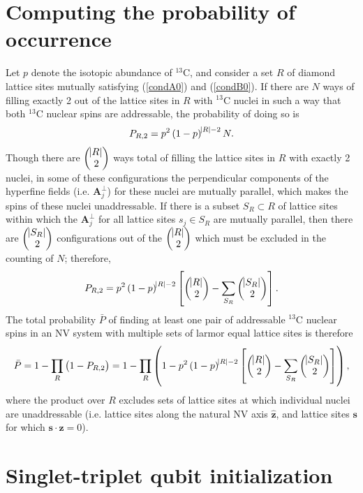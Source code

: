 \documentclass[11pt]{article}
\newcommand{\p}[1]{\left(#1\right)} %
\renewcommand{\sp}[1]{\left[#1\right]} %
\renewcommand{\v}{\bm} %
\newcommand{\uv}[1]{\hat{\v{#1}}} %
\renewcommand{\c}{\cdot} %
\newcommand{\m}[1]{\begin{pmatrix}#1\end{pmatrix}} %
\begin{document}
\section*{Computing the probability of occurrence}

Let $p$ denote the isotopic abundance of $^{13}$C, and consider a set
$R$ of diamond lattice sites mutually satisfying (\ref{condA0}) and
(\ref{condB0}). If there are $N$ ways of filling exactly 2 out of the
lattice sites in $R$ with $^{13}$C nuclei in such a way that both
$^{13}$C nuclear spins are addressable, the probability of doing so is
\begin{align}
  P_{R,2}=p^2\p{1-p}^{\abs{R}-2}N.
\end{align}
Though there are $\m{\abs{R}\\2}$ ways total of filling the lattice
sites in $R$ with exactly 2 nuclei, in some of these configurations
the perpendicular components of the hyperfine fields (i.e.
$\v A_j^\perp$) for these nuclei are mutually parallel, which makes
the spins of these nuclei unaddressable. If there is a subset
$S_R\subset R$ of lattice sites within which the $\v A_j^\perp$ for
all lattice sites $s_j\in S_R$ are mutually parallel, then there are
$\m{\abs{S_R}\\2}$ configurations out of the $\m{\abs{R}\\2}$ which
must be excluded in the counting of $N$; therefore,
\begin{align}
  P_{R,2}=p^2\p{1-p}^{\abs{R}-2}
  \sp{\m{\abs{R}\\2}-\sum_{S_R}\m{\abs{S_R}\\2}}.
\end{align}
The total probability $\bar P$ of finding at least one pair of
addressable $^{13}$C nuclear spins in an NV system with multiple sets
of larmor equal lattice sites is therefore
\begin{align}
  \bar P=1-\prod_R\p{1-P_{R,2}}
  =1-\prod_R\p{1-p^2\p{1-p}^{\abs{R}-2}
  \sp{\m{\abs{R}\\2}-\sum_{S_R}\m{\abs{S_R}\\2}}},
\end{align}
where the product over $R$ excludes sets of lattice sites at which
individual nuclei are unaddressable (i.e. lattice sites along the
natural NV axis $\uv z$, and lattice sites $\v s$ for which
$\v s\c\uv z=0$).

\newpage
\section*{Singlet-triplet qubit initialization}
\end{document}
